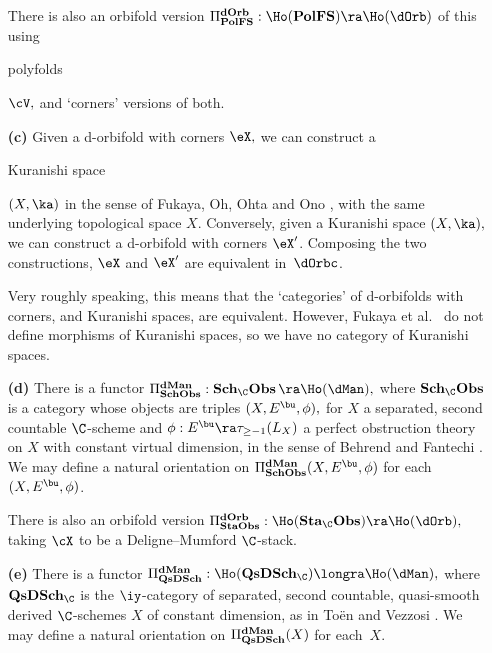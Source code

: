 \documentclass{article}
\begin{document}
\begin{thm}
\begin{itemize}
There is also an orbifold version $\Pi_{\bf PolFS}^{\bf
dOrb}:\Ho(\mathop{\bf PolFS})\ra\Ho(\dOrb)$ of this using
\begin{bfseries}polyfolds\end{bfseries} $\cV,$ and `corners'
versions of both.
\item[{\bf(c)}] Given a d-orbifold with corners $\eX,$ we can
construct a \begin{bfseries}Kuranishi
space\end{bfseries} $(X,\ka)$ in the
sense of Fukaya, Oh, Ohta and Ono\/ {\rm\cite[\S A]{FOOO},} with
the same underlying topological space $X$. Conversely, given a
Kuranishi space $(X,\ka),$ we can construct a d-orbifold with
corners $\eX'$. Composing the two constructions, $\eX$ and\/
$\eX'$ are equivalent in\/~$\dOrbc$.

Very roughly speaking, this means that the `categories' of
d-orbifolds with corners, and Kuranishi spaces, are equivalent.
However, Fukaya et al.\ {\rm\cite{FOOO}} do not define morphisms
of Kuranishi spaces, so we have no category of Kuranishi spaces.
\item[{\bf(d)}] There is a functor\/ $\Pi_{\bf SchObs}^{\bf
dMan}:\mathop{\bf Sch_\C Obs}\ra\Ho(\dMan),$ where $\mathop{\bf Sch_\C Obs}$ is a
category whose objects are triples $(X,E^\bu,\phi),$ for $X$ a
separated, second countable $\C$-scheme and\/ $\phi:E^\bu\ra
\tau_{\ge -1}(L_X)$ a perfect obstruction theory on $X$ with
constant virtual dimension, in the sense of Behrend and
Fantechi\/ {\rm\cite{BeFa}}. We may define a natural
orientation on $\Pi_{\bf SchObs}^{\bf
dMan}(X,E^\bu,\phi)$ for each\/~$(X,E^\bu,\phi)$.

There is also an orbifold version\/ $\Pi_{\bf StaObs}^{\bf
dOrb}:\Ho(\mathop{\bf Sta_\C Obs})\ra\Ho(\dOrb),$ taking $\cX$
to be a Deligne--Mumford\/ $\C$-stack.
\item[{\bf(e)}] There is a functor\/ $\Pi_{\bf QsDSch}^{\bf
dMan}:\Ho(\mathop{\bf QsDSch_\C})\longra\Ho(\dMan),$ where
$\mathop{\bf QsDSch_\C}$ is the $\iy$-category
of separated, second countable, quasi-smooth
derived\/ $\C$-schemes  $X$ of
constant dimension, as in To\"en and Vezzosi\/
{\rm\cite{Toen,ToVe1,ToVe2}}. We may define a natural
orientation on $\Pi_{\bf QsDSch}^{\bf dMan}(X)$ for each\/~$X$.


\end{itemize}
\end{thm}
\end{document}

